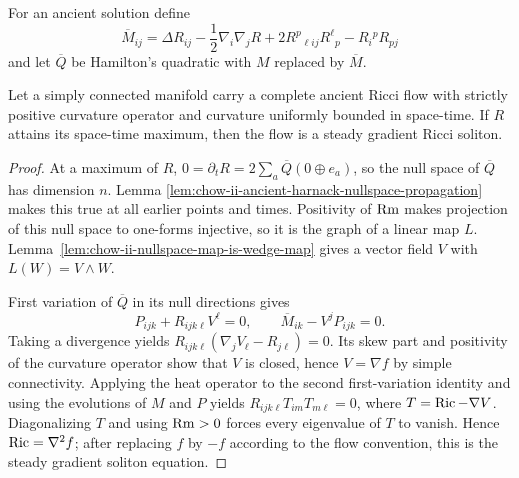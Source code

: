 For an ancient solution define
\[
\overline M_{ij}=\Delta R_{ij}-\frac12\nabla_i\nabla_jR
+2R^p{}_{\ell ij}R^\ell{}_p-R_i{}^pR_{pj}
\]
and let \(\overline Q\) be Hamilton's quadratic with \(M\) replaced by
\(\overline M\).

\begin{theorem}
\label{thm:chow-ii-ancient-positive-curvature-maximizer-steady-soliton}
Let a simply connected manifold carry a complete ancient Ricci flow with
strictly positive curvature operator and curvature uniformly bounded in
space-time.  If \(R\) attains its space-time maximum, then the flow is a
steady gradient Ricci soliton.
\end{theorem}
\begin{proof}
At a maximum of \(R\),
\(0=\partial_tR=2\sum_a\overline Q(0\oplus e_a)\), so the null space of
\(\overline Q\) has dimension \(n\).  Lemma
\ref{lem:chow-ii-ancient-harnack-nullspace-propagation} makes this true at all
earlier points and times.  Positivity of \(\operatorname{Rm}\) makes projection of this null
space to one-forms injective, so it is the graph of a linear map \(L\).
Lemma~\ref{lem:chow-ii-nullspace-map-is-wedge-map} gives a vector field \(V\)
with \(L(W)=V\wedge W\).

First variation of \(\overline Q\) in its null directions gives
\[
P_{ijk}+R_{ijk\ell}V^\ell=0,
\qquad \overline M_{ik}-V^jP_{ijk}=0.
\]
Taking a divergence yields
\(R_{ijk\ell}(\nabla_jV_\ell-R_{j\ell})=0\).  Its skew part and positivity
of the curvature operator show that \(V\) is closed, hence \(V=\nabla f\) by
simple connectivity.  Applying the heat operator to the second first-variation
identity and using the evolutions of \(M\) and \(P\) yields
\(R_{ijk\ell}T_{im}T_{m\ell}=0\), where
\(T=\operatorname{Ric}-\nabla V\).  Diagonalizing \(T\) and using \(\operatorname{Rm}>0\) forces every
eigenvalue of \(T\) to vanish.  Hence \(\operatorname{Ric}=\nabla^2f\); after replacing
\(f\) by \(-f\) according to the flow convention, this is the steady gradient
soliton equation.
\end{proof}

